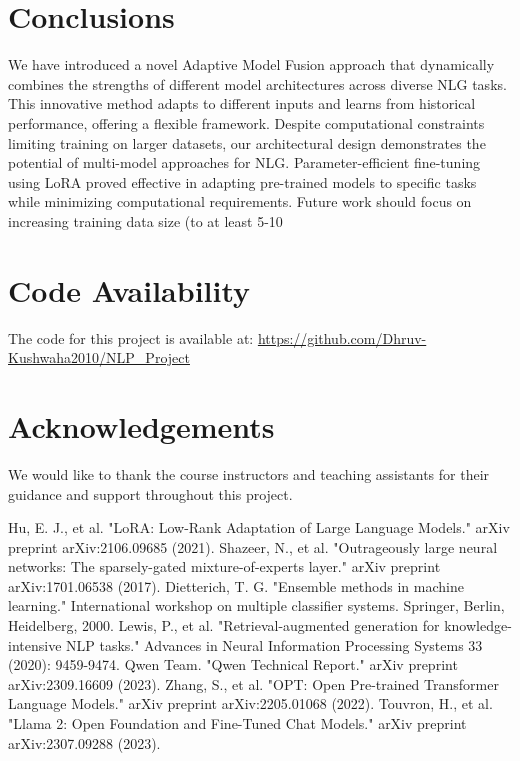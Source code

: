 \documentclass[10pt,twocolumn,letterpaper]{article}
\begin{document}
\section*{Conclusions}
We have introduced a novel Adaptive Model Fusion approach that dynamically combines the strengths of different model architectures across diverse NLG tasks. This innovative method adapts to different inputs and learns from historical performance, offering a flexible framework. Despite computational constraints limiting training on larger datasets, our architectural design demonstrates the potential of multi-model approaches for NLG. Parameter-efficient fine-tuning using LoRA proved effective in adapting pre-trained models to specific tasks while minimizing computational requirements. Future work should focus on increasing training data size (to at least 5-10%

\section*{Code Availability}
The code for this project is available at: \url{https://github.com/Dhruv-Kushwaha2010/NLP_Project}

\section*{Acknowledgements}
We would like to thank the course instructors and teaching assistants for their guidance and support throughout this project.

\begin{thebibliography}{9}
 Hu, E. J., et al. "LoRA: Low-Rank Adaptation of Large Language Models." arXiv preprint arXiv:2106.09685 (2021).
 Shazeer, N., et al. "Outrageously large neural networks: The sparsely-gated mixture-of-experts layer." arXiv preprint arXiv:1701.06538 (2017).
 Dietterich, T. G. "Ensemble methods in machine learning." International workshop on multiple classifier systems. Springer, Berlin, Heidelberg, 2000.
 Lewis, P., et al. "Retrieval-augmented generation for knowledge-intensive NLP tasks." Advances in Neural Information Processing Systems 33 (2020): 9459-9474.
 Qwen Team. "Qwen Technical Report." arXiv preprint arXiv:2309.16609 (2023).
 Zhang, S., et al. "OPT: Open Pre-trained Transformer Language Models." arXiv preprint arXiv:2205.01068 (2022).
 Touvron, H., et al. "Llama 2: Open Foundation and Fine-Tuned Chat Models." arXiv preprint arXiv:2307.09288 (2023).
\end{thebibliography}
\end{document}
